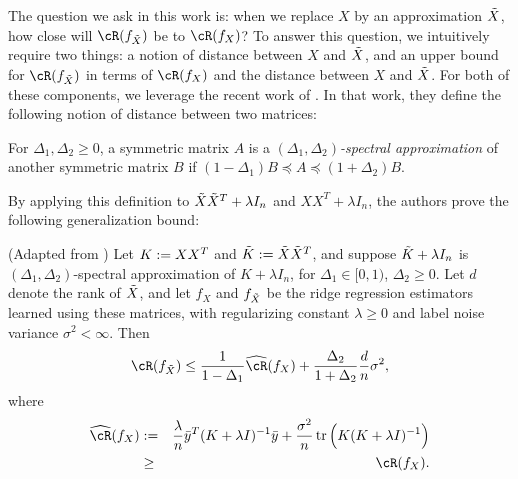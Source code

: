 The question we ask in this work is: when we replace $X$ by an approximation $\tX$, how close will $\cR(f_{\tX})$ be to $\cR(f_X)$?
To answer this question, we intuitively require two things: a notion of distance between $X$ and $\tX$, and an upper bound for $\cR(f_{\tX})$ in terms of $\cR(f_X)$ and the distance between $X$ and $\tX$.
For both of these components, we leverage the recent work of \citep{lprff18}.
In that work, they define the following notion of distance between two matrices:

\begin{definition}{\citep{lprff18}}
	\label{def:specdist}
	For $\Delta_1, \Delta_2 \geq 0$, a symmetric matrix $A$ is a \emph{$(\Delta_1, \Delta_2)$-spectral approximation} of another symmetric matrix $B$ if $(1-\Delta_1)B \preceq A \preceq (1+\Delta_2)B$. 
\end{definition}

By applying this definition to $\tX\tX^T + \lambda I_n$ and $XX^T + \lambda I_n$, the authors prove the following generalization bound:
\begin{proposition}{(Adapted from \citep{lprff18})}
	Let $K \defeq XX^T$ and $\tK \defeq \tX\tX^T$, and suppose $\tK + \lambda I_n$ is $(\Delta_1, \Delta_2)$-spectral approximation of $K+\lambda I_n$, for $\Delta_1 \in [0,1)$, $\Delta_2 \geq 0$.
	Let $d$ denote the rank of $\tX$, and let $f_{X}$ and $f_{\tX}$ be the ridge regression estimators learned using these matrices, with regularizing constant $\lambda \geq 0$ and label noise variance $\sigma^2 < \infty$. Then
	\begin{equation}
	\cR(f_{\tX}) \leq \frac{1}{1-\Delta_1} \hcR(f_X) +  \frac{\Delta_2}{1+\Delta_2}\frac{d}{n}\sigma^2,
	\label{eq:risk_bound}
	\end{equation}
	where 
	\begin{eqnarray*}
	\hcR(f_X) &\defeq& \frac{\lambda}{n} \by^T(K+\lambda I)^{-1}\by + \frac{\sigma^2}{n}\tr\Big(K(K+\lambda I)^{-1}\Big) \\
	&\geq& \cR(f_X).
	\end{eqnarray*}
	\label{prop:genbound}
\end{proposition}


